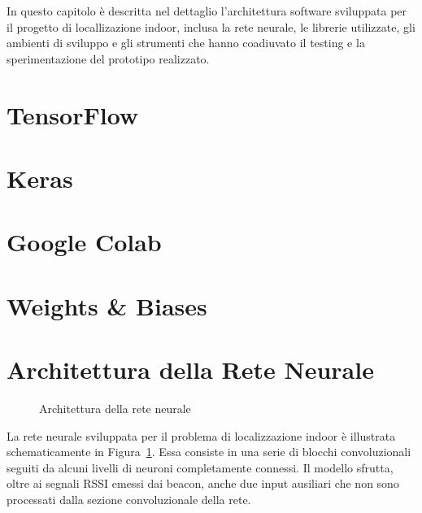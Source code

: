 
\newcommand{\yhatone}{\bm\hat{\bm y}_1}
\newcommand{\yhattwo}{\bm\hat{\bm y}_2}
\newcommand{\yold}{\bm y_{\mathit{old}}}
In questo capitolo è descritta nel dettaglio l'architettura software sviluppata
per il progetto di locallizazione indoor, inclusa la rete neurale, le librerie
utilizzate, gli ambienti di sviluppo e gli strumenti che hanno coadiuvato il
testing e la sperimentazione del prototipo realizzato.
\section{TensorFlow}
\section{Keras}
\section{Google Colab}
\section{Weights \& Biases}
\section{Architettura della Rete Neurale}
\begin{figure}[H]
  \caption{Architettura della rete neurale}%
  \label{fig:crynet}%
\end{figure}
La rete neurale sviluppata per il problema di localizzazione indoor è
illustrata schematicamente in Figura~\ref{fig:crynet}. Essa consiste in una
serie di blocchi convoluzionali seguiti da alcuni livelli di neuroni
completamente connessi. Il modello sfrutta, oltre ai segnali RSSI emessi dai
beacon, anche due input ausiliari che non sono processati dalla sezione
convoluzionale della rete.
